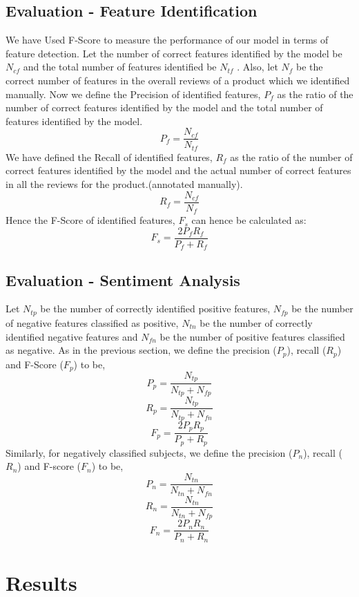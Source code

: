 \documentclass[conference]{IEEEtran}
\begin{document}
\subsection{\textbf{Evaluation - Feature Identification}}
\indent We have Used F-Score to measure the performance of our model in terms of feature detection. Let the number of correct features identified by the model be $N_{cf}$  and the total number of features identified be $N_{tf}$ . Also, let $N_{f}$ be the correct number of features in the overall reviews of a product which we identified manually. Now we define the Precision of identified features, $P_{f}$ as the ratio of the number of correct features identified by the model and the total number of features identified by the model.
$$P_{f}=\frac{N_{cf}}{N_{tf}}$$We have defined the Recall of identified features, $R_{f}$ as the ratio of the number of correct features identified by the model and the actual number of correct features in all the reviews for the product.(annotated manually).$$R_{f}=\frac{N_{cf}}{N_{f}}$$
Hence the F-Score of  identified features, $F_{s}$ can hence be calculated as:
$$F_{s}=\frac{2P_{f}R_{f}}{P_{f}+R_{f}}$$
\subsection{\textbf{ Evaluation - Sentiment Analysis}}
\indent Let $N_{tp}$ be the number of correctly identified positive features, $N_{fp}$ be the number of negative features classified as positive, $N_{tn}$ be the number of correctly identified negative features and $N_{fn}$ be the number of positive features classified as negative.
As in the previous section, we define the precision ($P_{p}$), recall ($R_{p}$) and F-Score ($F_{p}$) to be,
$$P_{p}=\frac{N_{tp}}{N_{tp}+N_{fp}}$$
$$R_{p}=\frac{N_{tp}}{N_{tp}+N_{fn}}$$
$$F_{p}=\frac{2P_{p}R_{p}}{P_{p}+R_{p}}$$
Similarly, for negatively classified subjects, we define the precision ($P_{n}$), recall ($R_{n}$) and F-score ($F_{n}$) to be,
$$P_{n}=\frac{N_{tn}}{N_{tn}+N_{fn}}$$
$$R_{n}=\frac{N_{tn}}{N_{tn}+N_{fp}}$$
$$F_{n}=\frac{2P_{n}R_{n}}{P_{n}+R_{n}}$$
\section{\textbf{Results}}
\end{document}
